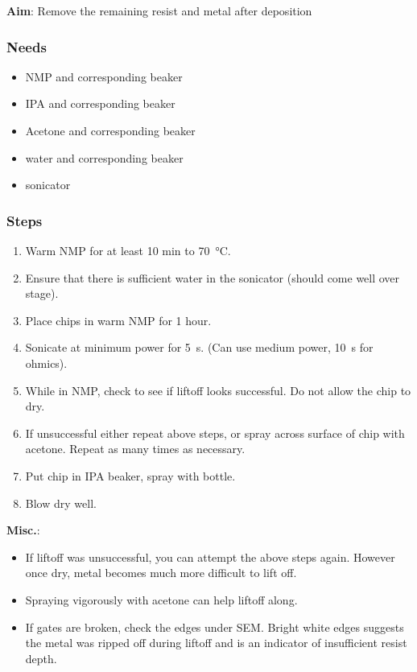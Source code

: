 \documentclass[12pt,a4paper]{report}
\begin{document}
\textbf{Aim}:
Remove the remaining resist and metal after deposition

\subsubsection{Needs}
\begin{itemize}[noitemsep]
\item NMP and corresponding beaker
\item IPA and corresponding beaker
\item Acetone and corresponding beaker
\item water and corresponding beaker
\item sonicator
\end{itemize}

\subsubsection{Steps}
\begin{enumerate}
\item Warm NMP for at least 10 min to \SI{70}{\celsius}.
\item Ensure that there is sufficient water in the sonicator (should come well over stage).
\item Place chips in warm NMP for 1 hour.
\item Sonicate at minimum power for \SI{5}{\second}. (Can use medium power, \SI{10}{\second} for ohmics).
\item While in NMP, check to see if liftoff looks successful. Do not allow the chip to dry.
\item If unsuccessful either repeat above steps, or spray across surface of chip with acetone. Repeat
as many times as necessary.
\item Put chip in IPA beaker, spray with bottle.
\item Blow dry well.
\end{enumerate}

\noindent \textbf{Misc.}:
\begin{itemize}
\item If liftoff was unsuccessful, you can attempt the above steps again. However once dry, metal becomes
much more difficult to lift off.
\item Spraying vigorously with acetone can help liftoff along.
\item If gates are broken, check the edges under SEM. Bright white edges suggests the metal was ripped
off during liftoff and is an indicator of insufficient resist depth.
\end{itemize}
\newpage
\end{document}
